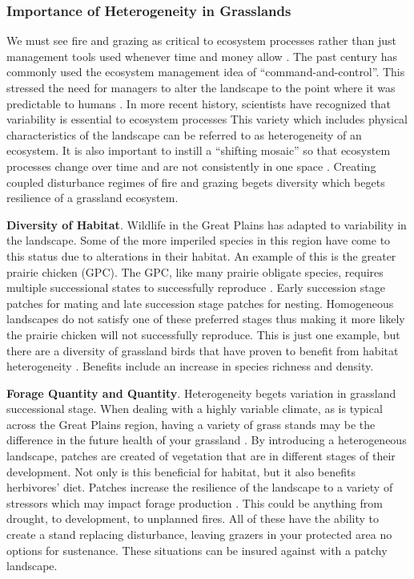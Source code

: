\hypertarget{importance-of-heterogeneity-in-grasslands}{%
	\subsubsection{Importance of Heterogeneity in
		Grasslands}\label{importance-of-heterogeneity-in-grasslands}}

We must see fire and grazing as critical to ecosystem processes rather than just management tools used whenever time and money allow \citep{fuhlendorf2012}. 
The past century has commonly used the ecosystem management idea of ``command-and-control''. 
This stressed the need for managers to alter the landscape to the point where it was predictable to humans \citep{holling1996}. 
In more recent history, scientists have recognized that variability is essential to ecosystem processes \citep{turner1989, wiens1997,larkin2016}
This variety which includes physical characteristics of the landscape can be referred to as heterogeneity of an ecosystem. 
It is also important to instill a ``shifting mosaic'' so that ecosystem processes change over time and are not consistently in one space \citep{fuhlendorf2004}. Creating coupled disturbance regimes of fire and grazing begets diversity which begets resilience of a grassland ecosystem.

\textbf{Diversity of Habitat}.
Wildlife in the Great Plains has adapted to variability in the landscape. 
Some of the more imperiled species in this region have come to this status due to alterations in their habitat. 
An example of this is the greater prairie chicken (GPC). 
The GPC, like many prairie obligate species, requires multiple successional states to successfully reproduce \citep{svedarsky2003}. 
Early succession stage patches for mating and late succession stage patches for nesting. 
Homogeneous landscapes do not satisfy one of these preferred stages thus making it more likely the prairie chicken will not successfully reproduce. 
This is just one example, but there are a
diversity of grassland birds that have proven to benefit from habitat heterogeneity \citep{churchwell2008, coppedge2008, stroppel2009, hovick2014}. 
Benefits include an increase in species richness and density.

\textbf{Forage Quantity and Quantity}. 
Heterogeneity begets variation in grassland successional stage. 
When dealing with a highly variable climate, as is typical across the Great Plains region, having a variety of grass stands may be the difference in the future health of your grassland \citep{mcgranahan2014}. 
By introducing a heterogeneous landscape, patches are created of vegetation that are in different stages of their development. 
Not only is this beneficial for habitat, but it also benefits herbivores' diet. 
Patches increase the resilience of the landscape to a variety of stressors which may impact forage
production \citep{fuhlendorf2017}. 
This could be anything from drought, to development, to unplanned fires. 
All of these have the ability to create a stand replacing disturbance, leaving grazers in your protected area no options for sustenance. 
These situations can be insured against with a patchy landscape.

